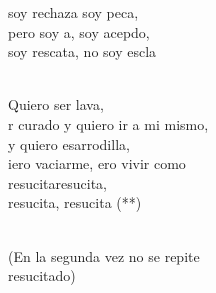 \begin{cancion}[Resucitados][]
	soy rechaza soy peca, \\
\jump
	pero soy a, soy acepdo, \\
	soy rescata, no soy escla \\\jump\\
	\begin{chorus}%
	Quiero  ser lava, \\
	r curado y quiero ir a mi mismo, \\
	y quiero esarrodilla, \\
	iero vaciarme, ero vivir como\\
	resucitaresucita, \\
	resucita, resucita (**) \\
	\end{chorus}%
	\jump\\
(En la segunda vez no se repite\\
resucitado)\\
\end{cancion}%
